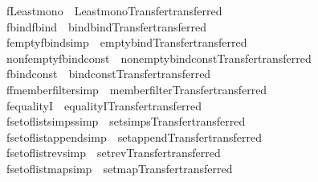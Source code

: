 \begin{isabellebody}
\isamarkupfalse%
\ fLeast{\isacharunderscore}mono\ {\isacharequal}\ Least{\isacharunderscore}mono{\isacharbrackleft}Transfer{\isachardot}transferred{\isacharbrackright}\isanewline
{}\isamarkupfalse%
\ fbind{\isacharunderscore}fbind\ {\isacharequal}\ bind{\isacharunderscore}bind{\isacharbrackleft}Transfer{\isachardot}transferred{\isacharbrackright}\isanewline
{}\isamarkupfalse%
\ fempty{\isacharunderscore}fbind{\isacharbrackleft}simp{\isacharbrackright}\ {\isacharequal}\ empty{\isacharunderscore}bind{\isacharbrackleft}Transfer{\isachardot}transferred{\isacharbrackright}\isanewline
{}\isamarkupfalse%
\ nonfempty{\isacharunderscore}fbind{\isacharunderscore}const\ {\isacharequal}\ nonempty{\isacharunderscore}bind{\isacharunderscore}const{\isacharbrackleft}Transfer{\isachardot}transferred{\isacharbrackright}\isanewline
{}\isamarkupfalse%
\ fbind{\isacharunderscore}const\ {\isacharequal}\ bind{\isacharunderscore}const{\isacharbrackleft}Transfer{\isachardot}transferred{\isacharbrackright}\isanewline
{}\isamarkupfalse%
\ ffmember{\isacharunderscore}filter{\isacharbrackleft}simp{\isacharbrackright}\ {\isacharequal}\ member{\isacharunderscore}filter{\isacharbrackleft}Transfer{\isachardot}transferred{\isacharbrackright}\isanewline
{}\isamarkupfalse%
\ fequalityI\ {\isacharequal}\ equalityI{\isacharbrackleft}Transfer{\isachardot}transferred{\isacharbrackright}\isanewline
{}\isamarkupfalse%
\ fset{\isacharunderscore}of{\isacharunderscore}list{\isacharunderscore}simps{\isacharbrackleft}simp{\isacharbrackright}\ {\isacharequal}\ set{\isacharunderscore}simps{\isacharbrackleft}Transfer{\isachardot}transferred{\isacharbrackright}\isanewline
{}\isamarkupfalse%
\ fset{\isacharunderscore}of{\isacharunderscore}list{\isacharunderscore}append{\isacharbrackleft}simp{\isacharbrackright}\ {\isacharequal}\ set{\isacharunderscore}append{\isacharbrackleft}Transfer{\isachardot}transferred{\isacharbrackright}\isanewline
{}\isamarkupfalse%
\ fset{\isacharunderscore}of{\isacharunderscore}list{\isacharunderscore}rev{\isacharbrackleft}simp{\isacharbrackright}\ {\isacharequal}\ set{\isacharunderscore}rev{\isacharbrackleft}Transfer{\isachardot}transferred{\isacharbrackright}\isanewline
{}\isamarkupfalse%
\ fset{\isacharunderscore}of{\isacharunderscore}list{\isacharunderscore}map{\isacharbrackleft}simp{\isacharbrackright}\ {\isacharequal}\ set{\isacharunderscore}map{\isacharbrackleft}Transfer{\isachardot}transferred{\isacharbrackright}%

\end{isabellebody}
